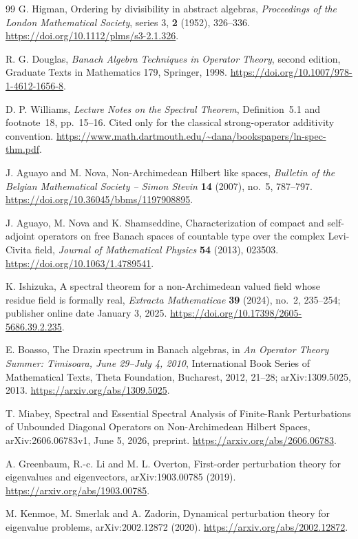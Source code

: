 \documentclass[11pt,a4paper]{article}
\numberwithin{equation}{section}
\theoremstyle{definition}
\theoremstyle{remark}
\begin{document}
\begin{thebibliography}{99}
G. Higman, Ordering by divisibility in abstract algebras,
\emph{Proceedings of the London Mathematical Society}, series 3,
\textbf{2} (1952), 326--336.
\url{https://doi.org/10.1112/plms/s3-2.1.326}.

R. G. Douglas, \emph{Banach Algebra Techniques in Operator Theory},
second edition, Graduate Texts in Mathematics 179, Springer, 1998.
\url{https://doi.org/10.1007/978-1-4612-1656-8}.

D. P. Williams, \emph{Lecture Notes on the Spectral Theorem},
Definition~5.1 and footnote~18, pp.~15--16.
Cited only for the classical strong-operator additivity convention.
\url{https://www.math.dartmouth.edu/~dana/bookspapers/ln-spec-thm.pdf}.

J. Aguayo and M. Nova, Non-Archimedean Hilbert like spaces,
\emph{Bulletin of the Belgian Mathematical Society -- Simon Stevin}
\textbf{14} (2007), no.~5, 787--797.
\url{https://doi.org/10.36045/bbms/1197908895}.

J. Aguayo, M. Nova and K. Shamseddine,
Characterization of compact and self-adjoint operators on free Banach
spaces of countable type over the complex Levi-Civita field,
\emph{Journal of Mathematical Physics} \textbf{54} (2013), 023503.
\url{https://doi.org/10.1063/1.4789541}.

K. Ishizuka, A spectral theorem for a non-Archimedean valued field whose
residue field is formally real,
\emph{Extracta Mathematicae} \textbf{39} (2024), no.~2, 235--254;
publisher online date January 3, 2025.
\url{https://doi.org/10.17398/2605-5686.39.2.235}.

E. Boasso, The Drazin spectrum in Banach algebras,
in \emph{An Operator Theory Summer: Timisoara, June 29--July 4, 2010},
International Book Series of Mathematical Texts, Theta Foundation,
Bucharest, 2012, 21--28; arXiv:1309.5025, 2013.
\url{https://arxiv.org/abs/1309.5025}.

T. Miabey, Spectral and Essential Spectral Analysis of Finite-Rank
Perturbations of Unbounded Diagonal Operators on Non-Archimedean Hilbert
Spaces, arXiv:2606.06783v1, June 5, 2026, preprint.
\url{https://arxiv.org/abs/2606.06783}.

A. Greenbaum, R.-c. Li and M. L. Overton,
First-order perturbation theory for eigenvalues and eigenvectors,
arXiv:1903.00785 (2019).
\url{https://arxiv.org/abs/1903.00785}.

M. Kenmoe, M. Smerlak and A. Zadorin,
Dynamical perturbation theory for eigenvalue problems,
arXiv:2002.12872 (2020).
\url{https://arxiv.org/abs/2002.12872}.


\end{thebibliography}
\end{document}
